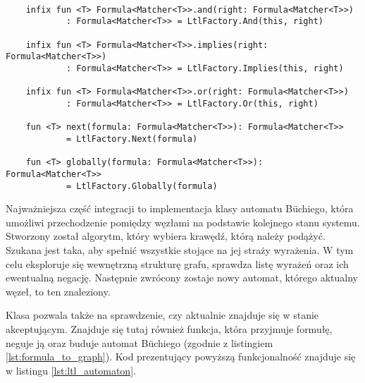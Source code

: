 \begin{minipage}{\linewidth}
\begin{lstlisting}[caption={Przykładowe funkcje do budowania formuł w języku Kotlin.},captionpos=b,label={lst:ltl_factory_extensions}]

    infix fun <T> Formula<Matcher<T>>.and(right: Formula<Matcher<T>>)
            : Formula<Matcher<T>> = LtlFactory.And(this, right)

    infix fun <T> Formula<Matcher<T>>.implies(right: Formula<Matcher<T>>)
            : Formula<Matcher<T>> = LtlFactory.Implies(this, right)

    infix fun <T> Formula<Matcher<T>>.or(right: Formula<Matcher<T>>)
            : Formula<Matcher<T>> = LtlFactory.Or(this, right)

    fun <T> next(formula: Formula<Matcher<T>>): Formula<Matcher<T>>
            = LtlFactory.Next(formula)

    fun <T> globally(formula: Formula<Matcher<T>>): Formula<Matcher<T>>
            = LtlFactory.Globally(formula)

\end{lstlisting}
\end{minipage}

Najważniejsza część integracji to implementacja klasy automatu Büchiego, która umożliwi przechodzenie pomiędzy węzłami na podstawie kolejnego stanu systemu.
Stworzony został algorytm, który wybiera krawędź, którą należy podążyć.
Szukana jest taka, aby spełnić wszystkie stojące na jej straży wyrażenia.
W tym celu eksploruje się wewnętrzną strukturę grafu, sprawdza listę wyrażeń oraz ich ewentualną negację.
Następnie zwrócony zostaje nowy automat, którego aktualny węzeł, to ten znaleziony.

Klasa pozwala także na sprawdzenie, czy aktualnie znajduje się w stanie akceptującym.
Znajduje się tutaj również funkcja, która przyjmuje formułę, neguje ją oraz buduje automat Büchiego (zgodnie z listingiem \ref{lst:formula_to_graph}).
Kod prezentujący powyższą funkcjonalność znajduje się w listingu \ref{lst:ltl_automaton}.

